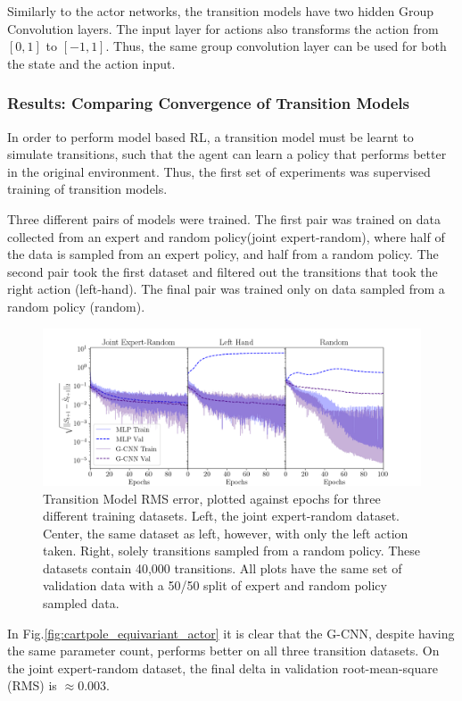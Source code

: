 Similarly to the actor networks, the transition models have two hidden Group Convolution layers. The input layer for actions also transforms the action from $[0, 1]$ to $[-1, 1]$. Thus, the same group convolution layer can be used for both the state and the action input.


\subsubsection{Results: Comparing Convergence of Transition Models}
In order to perform model based RL, a transition model must be learnt to simulate transitions, such that the agent can learn a policy that performs better in the original environment. Thus, the first set of experiments was supervised training of transition models.

Three different pairs of models were trained. The first pair was trained on data collected from an expert and random policy(joint expert-random), where half of the data is sampled from an expert policy, and half from a random policy. The second pair took the first dataset and filtered out the transitions that took the right action (left-hand). The final pair was trained only on data sampled from a random policy (random).
\begin{figure}
	\centering
	\includegraphics[width=\linewidth]{Figures/transition_model_loss.png}
	\caption{Transition Model RMS error, plotted against epochs for three different training datasets. Left, the joint expert-random dataset. Center, the same dataset as left, however, with only the left action taken. Right, solely transitions sampled from a random policy. These datasets contain 40,000 transitions. All plots have the same set of validation data with a 50/50 split of expert and random policy sampled data.}
	\label{fig:transition_model_cp}
\end{figure}

In Fig.\ref{fig:cartpole_equivariant_actor} it is clear that the G-CNN, despite having the same parameter count, performs better on all three transition datasets. On the joint expert-random dataset, the final delta in validation root-mean-square (RMS) is $\approx 0.003$.

